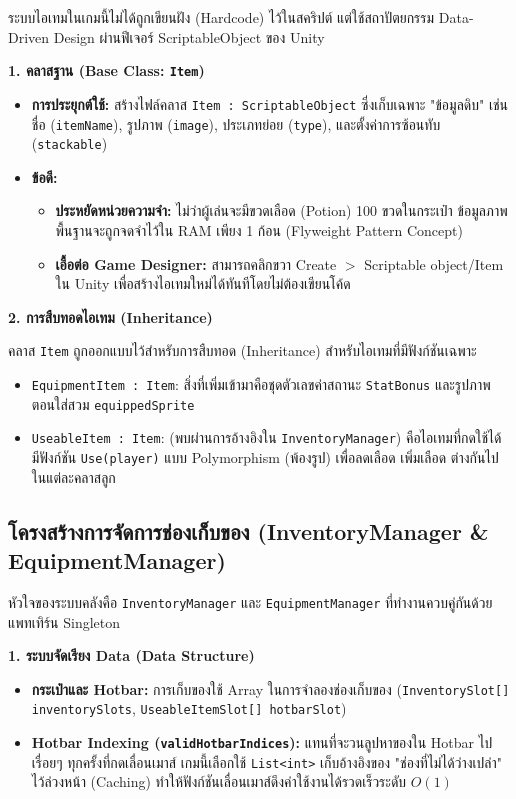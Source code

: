 ระบบไอเทมในเกมนี้ไม่ได้ถูกเขียนฝัง (Hardcode) ไว้ในสคริปต์ แต่ใช้สถาปัตยกรรม Data-Driven Design ผ่านฟีเจอร์ ScriptableObject ของ Unity

\textbf{1. คลาสฐาน (Base Class: \texttt{Item})}

\begin{itemize}
\item \textbf{การประยุกต์ใช้:} สร้างไฟล์คลาส \texttt{Item : ScriptableObject} ซึ่งเก็บเฉพาะ "ข้อมูลดิบ" เช่น ชื่อ (\texttt{itemName}), รูปภาพ (\texttt{image}), ประเภทย่อย (\texttt{type}), และตั้งค่าการซ้อนทับ (\texttt{stackable})
\item \textbf{ข้อดี:}
    \begin{itemize}
    \item \textbf{ประหยัดหน่วยความจำ:} ไม่ว่าผู้เล่นจะมีขวดเลือด (Potion) 100 ขวดในกระเป๋า ข้อมูลภาพพื้นฐานจะถูกจดจำไว้ใน RAM เพียง 1 ก้อน (Flyweight Pattern Concept)
    \item \textbf{เอื้อต่อ Game Designer:} สามารถคลิกขวา Create $>$ Scriptable object/Item ใน Unity เพื่อสร้างไอเทมใหม่ได้ทันทีโดยไม่ต้องเขียนโค้ด
    \end{itemize}
\end{itemize}

\textbf{2. การสืบทอดไอเทม (Inheritance)}

คลาส \texttt{Item} ถูกออกแบบไว้สำหรับการสืบทอด (Inheritance) สำหรับไอเทมที่มีฟังก์ชันเฉพาะ

\begin{itemize}
\item \texttt{EquipmentItem : Item}: สิ่งที่เพิ่มเข้ามาคือชุดตัวเลขค่าสถานะ \texttt{StatBonus} และรูปภาพตอนใส่สวม \texttt{equippedSprite}
\item \texttt{UseableItem : Item}: (พบผ่านการอ้างอิงใน \texttt{InventoryManager}) คือไอเทมที่กดใช้ได้ มีฟังก์ชัน \texttt{Use(player)} แบบ Polymorphism (พ้องรูป) เพื่อลดเลือด เพิ่มเลือด ต่างกันไปในแต่ละคลาสลูก
\end{itemize}

\subsection{โครงสร้างการจัดการช่องเก็บของ (InventoryManager \& EquipmentManager)}

หัวใจของระบบคลังคือ \texttt{InventoryManager} และ \texttt{EquipmentManager} ที่ทำงานควบคู่กันด้วยแพทเทิร์น Singleton

\textbf{1. ระบบจัดเรียง Data (Data Structure)}

\begin{itemize}
\item \textbf{กระเป๋าและ Hotbar:} การเก็บของใช้ Array ในการจำลองช่องเก็บของ (\texttt{InventorySlot[] inventorySlots}, \texttt{UseableItemSlot[] hotbarSlot})
\item \textbf{Hotbar Indexing (\texttt{validHotbarIndices}):} แทนที่จะวนลูปหาของใน Hotbar ไปเรื่อยๆ ทุกครั้งที่กดเลื่อนเมาส์ เกมนี้เลือกใช้ \texttt{List<int>} เก็บอ้างอิงของ "ช่องที่ไม่ได้ว่างเปล่า" ไว้ล่วงหน้า (Caching) ทำให้ฟังก์ชันเลื่อนเมาส์ดึงค่าใช้งานได้รวดเร็วระดับ $O(1)$
\end{itemize}

